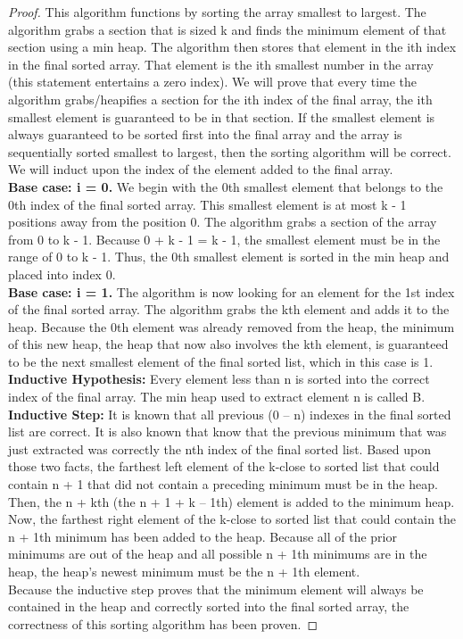 \documentclass[11pt, solution, letterpaper]{format}
\begin{document}
\begin{proof}This algorithm functions by sorting the array smallest to largest. The algorithm grabs a section that is sized k and finds the minimum element of that section using a min heap. The algorithm then stores that element in the ith index in the final sorted array. That element is the ith smallest number in the array (this statement entertains a zero index). We will prove that every time the algorithm grabs/heapifies a section for the ith index of the final array, the ith smallest element is guaranteed to be in that section. If the smallest element is always guaranteed to be sorted first into the final array and the array is sequentially sorted smallest to largest, then the sorting algorithm will be correct. We will induct upon the index of the element added to the final array.\\

\textbf{Base case: i = 0.}
We begin with the 0th smallest element that belongs to the 0th index of the final sorted array. This smallest element is at most k - 1 positions away from the position 0. The algorithm grabs a section of the array from 0 to k - 1. Because 0 + k - 1 = k - 1, the smallest element must be in the range of 0 to k - 1. Thus, the 0th smallest element is sorted in the min heap and placed into index 0.\\

\textbf{Base case: i = 1.}
The algorithm is now looking for an element for the 1st index of the final sorted array. The algorithm grabs the kth element and adds it to the heap. Because the 0th element was already removed from the heap, the minimum of this new heap, the heap that now also involves the kth element,  is guaranteed to be the next smallest element of the final sorted list, which in this case is 1.\\

\textbf{Inductive Hypothesis:} Every element less than n is sorted into the correct index of the final array. The min heap used to extract element n is called B.\\

\textbf{Inductive Step:} It is known that all previous (0 – n) indexes in the final sorted list are correct. It is also known that  know that the previous minimum that was just extracted was correctly the nth index of the final sorted list. Based upon those two facts, the farthest left element of the k-close to sorted list that could contain n + 1 that did not contain a preceding minimum must be in the heap.  Then, the n + kth (the n + 1 + k – 1th) element is added to the minimum heap. Now, the farthest right element of the k-close to sorted list that could contain the n + 1th minimum has been added to the heap. Because all of the prior minimums are out of the heap and all possible n + 1th minimums are in the heap, the heap’s newest minimum must be the n + 1th  element.\\

Because the inductive step proves that the minimum element will always be contained in the heap and correctly sorted into the final sorted array, the correctness of this sorting algorithm has been proven.\end{proof}
\end{document}
